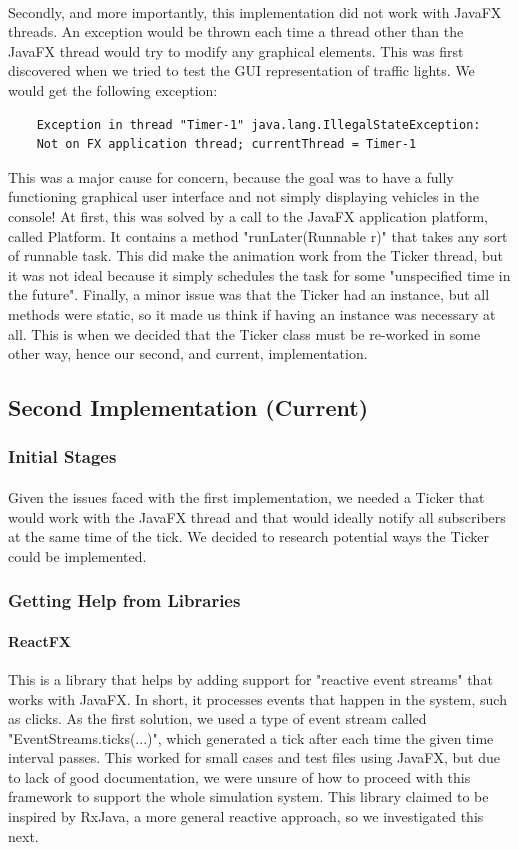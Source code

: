 \documentclass[a4paper,11pt,titlepage]{article}
\begin{document}
\paragraph{}
Secondly, and more importantly, this implementation did not work with JavaFX threads. An exception would be thrown each time a thread other than the JavaFX thread would try to modify any graphical elements. This was first discovered when we tried to test the GUI representation of traffic lights. We would get the following exception:
\begin{lstlisting}
	Exception in thread "Timer-1" java.lang.IllegalStateException:
	Not on FX application thread; currentThread = Timer-1
\end{lstlisting}
This was a major cause for concern, because the goal was to have a fully functioning graphical user interface and not simply displaying vehicles in the console! At first, this was solved by a call to the JavaFX application platform, called Platform. It contains a method "runLater(Runnable r)" that takes any sort of runnable task. This did make the animation work from the Ticker thread, but it was not ideal because it simply schedules the task for some "unspecified time in the future". Finally, a minor issue was that the Ticker had an instance, but all methods were static, so it made us think if having an instance was necessary at all. This is when we decided that the Ticker class must be re-worked in some other way, hence our second, and current, implementation.
\subsection{Second Implementation (Current)}
\subsubsection{Initial Stages}
\paragraph{}
Given the issues faced with the first implementation, we needed a Ticker that would work with the JavaFX thread and that would ideally notify all subscribers at the same time of the tick. We decided to research potential ways the Ticker could be implemented.
\subsubsection{Getting Help from Libraries}
\paragraph{ReactFX}
This is a library that helps by adding support for "reactive event streams" that works with JavaFX. In short, it processes events that happen in the system, such as clicks. As the first solution, we used a type of event stream called "EventStreams.ticks(...)", which generated a tick after each time the given time  interval passes. This worked for small cases and test files using JavaFX, but due to lack of good documentation, we were unsure of how to proceed with this framework to support the whole simulation system. This library claimed to be inspired by RxJava, a more general reactive approach, so we investigated this next.
\end{document}
